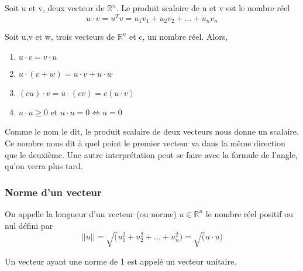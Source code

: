 \documentclass{article}
\begin{document}
\begin{definition}
    Soit u et v, deux vecteur de $\mathbb{R}^n$. Le produit scalaire de u
    et v est le nombre réel $$ u \cdot v = u^T v = u_1 v_1 + u_2 v_2 +
    ... + u_n v_n$$
\end{definition}

\begin{theorem}
    Soit u,v et w, trois vecteurs de $\mathbb{R}^n$ et c, un nombre réel.
    Alors,
    \begin{enumerate}
	\item $ u \cdot v = v \cdot u$
	\item $ u \cdot (v+w) = u \cdot v + u \cdot w$
	\item $(cu) \cdot v = u \cdot (cv) = c(u \cdot v)$
	\item $ u \cdot u \geq 0$ et $ u \cdot u = 0 \Longleftrightarrow
	    u = 0$
    \end{enumerate}
\end{theorem}

\begin{remark}
    Comme le nom le dit, le produit scalaire de deux vecteurs nous donne
    un scalaire. Ce nombre nous dit à quel point le premier vecteur va
    dans la même direction que le deuxième. Une autre interprétation peut
    se faire avec la formule de l'angle, qu'on verra plus tard.
\end{remark}

\subsubsection{Norme d'un vecteur}

\begin{theorem}
    On appelle la longueur d'un vecteur (ou norme) $u \in \mathbb{R}^n$
    le nombre réel positif ou nul défini par
    $$ || u|| = \sqrt(u_1 ^2 + u_2 ^2 + ... + u_n^2) = \sqrt(u \cdot u)$$
\end{theorem}

\begin{definition}
    Un vecteur ayant une norme de 1 est appelé un vecteur unitaire.
\end{definition}

\begin{intuition}
\end{intuition}
\end{document}
